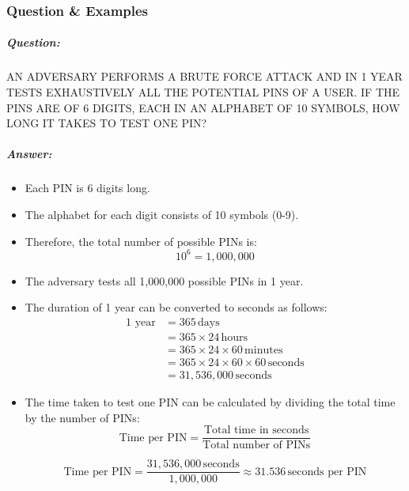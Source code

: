 \documentclass{article}
\begin{document}
                \subsubsection{Question \& Examples}
                            \subparagraph{Question:}
                                                        AN ADVERSARY PERFORMS A BRUTE
                            FORCE ATTACK AND IN 1 YEAR TESTS
                            EXHAUSTIVELY ALL THE POTENTIAL
                            PINS OF A USER.
                            IF THE PINS ARE OF 6 DIGITS, EACH IN
                            AN ALPHABET OF 10 SYMBOLS, HOW
                            LONG IT TAKES TO TEST ONE PIN?
                            \subparagraph{Answer:}
                            \begin{itemize}
                                \item Each PIN is 6 digits long.
                                \item The alphabet for each digit consists of 10 symbols (0-9).
                                \item Therefore, the total number of possible PINs is:
                                \[
                                10^6 = 1,000,000
                                \]
                                \item The adversary tests all 1,000,000 possible PINs in 1 year.
                            
                            \item The duration of 1 year can be converted to seconds as follows:
                                \begin{align*}
                                \text{1 year} &= 365 \, \text{days} \\
                                &= 365 \times 24 \, \text{hours} \\
                                &= 365 \times 24 \times 60 \, \text{minutes} \\
                                &= 365 \times 24 \times 60 \times 60 \, \text{seconds} \\
                                &= 31,536,000 \, \text{seconds}
                                \end{align*}
                            
                            \item The time taken to test one PIN can be calculated by dividing the total time by the number of PINs:
                                \[
                                \text{Time per PIN} = \frac{\text{Total time in seconds}}{\text{Total number of PINs}}
                                \]
                            
                                \[
                                \text{Time per PIN} = \frac{31,536,000 \, \text{seconds}}{1,000,000} \approx 31.536 \, \text{seconds per PIN}
                                \]
                            
                            \end{itemize}
                            
\end{document}
